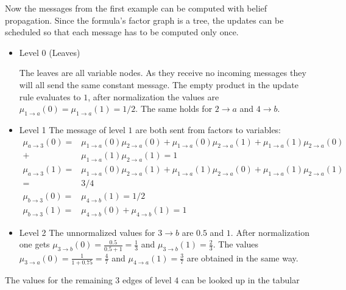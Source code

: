 \begin{example}
Now the messages from the first example can be computed with belief propagation.
Since the formula's factor graph is a tree, the updates can be scheduled so that each message has to be computed only once.

\begin{itemize}
\item Level 0 (Leaves)

The leaves are all variable nodes. As they receive no incoming messages they will all send the same constant message. The empty product in the update rule evaluates to $1$, after normalization the values are \newline $\mu_{1 \rightarrow a}(0) = \mu_{1 \rightarrow a}(1) = 1/2$. The same holds for $2 \rightarrow a$ and $4 \rightarrow b$.

\item Level 1
The message of level $1$ are both sent from factors to variables: 
\begin{align*}
\mu_{a \rightarrow 3}(0) = &\mu_{1 \rightarrow a}(0)\mu_{2 \rightarrow a}(0) + \mu_{1 \rightarrow a}(0)\mu_{2 \rightarrow a}(1) + \mu_{1 \rightarrow a}(1) \mu_{2 \rightarrow a}(0) \\ + & \mu_{1 \rightarrow a}(1)\mu_{2 \rightarrow a}(1) = 1 \\
\mu_{a \rightarrow 3}(1) = &\mu_{1 \rightarrow a}(0)\mu_{2 \rightarrow a}(1) + \mu_{1 \rightarrow a}(1) \mu_{2 \rightarrow a}(0) + \mu_{1 \rightarrow a}(1)\mu_{2 \rightarrow a}(1) \\ = &3/4 \\
\mu_{b \rightarrow 3}(0) = &\mu_{4 \rightarrow b}(1) = 1/2 \\
\mu_{b \rightarrow 3}(1) = &\mu_{4 \rightarrow b}(0) + \mu_{4 \rightarrow b}(1) = 1
\end{align*}

\item Level 2
The unnormalized values for $3 \rightarrow b$ are $0.5$ and $1$. After normalization one gets $\mu_{3 \rightarrow b}(0) = \frac{0.5}{0.5 + 1} = \frac{1}{3}$ and $\mu_{3 \rightarrow b}(1) = \frac{2}{3}$. \newline
The values $\mu_{3 \rightarrow a}(0) = \frac{1}{1 + 0.75} = \frac{4}{7}$ and $\mu_{4 \rightarrow a}(1) = \frac{3}{7}$ are obtained in the same way.

\end{itemize}
The values for the remaining 3 edges of level $4$ can be looked up in the tabular

\end{example}

